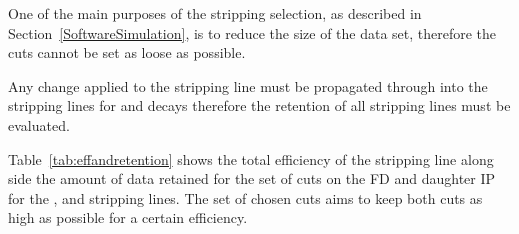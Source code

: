 One of the main purposes of the stripping selection, as described in Section~\ref{SoftwareSimulation}, is to reduce the size of the data set, therefore the cuts cannot be set as loose as possible. 

Any change applied to the \bmumu stripping line must be propagated through into the stripping lines for \bhh and \bujpsik decays therefore the retention of all stripping lines must be evaluated.

Table~\ref{tab:effandretention} shows the total efficiency of the \bsmumu stripping line along side the amount of data retained for the set of cuts on the FD \chisqd and daughter IP \chisqd for the \bmumu, \bhh and \bujpsik stripping lines. The set of chosen cuts aims to keep both cuts as high as possible for a certain \bsmumu efficiency. 




